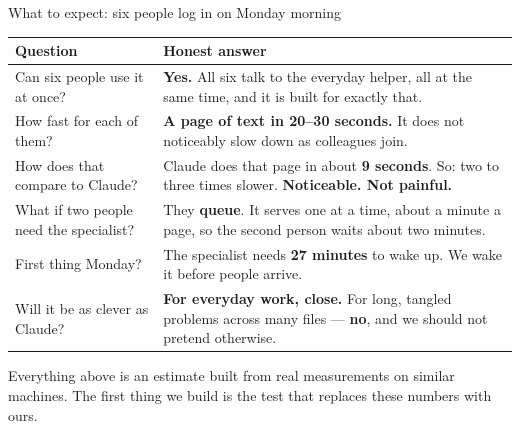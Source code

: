 \documentclass[aspectratio=169]{beamer}
\begin{document}
\begin{frame}{What to expect: six people log in on Monday morning}

\begin{center}
\scriptsize
\renewcommand{\arraystretch}{1.35}
\begin{tabular}{@{}p{}p{}@{}}
\toprule
\textbf{Question} & \textbf{Honest answer} \\
\midrule
Can six people use it at once? & \textbf{Yes.} All six talk to the everyday helper, all at the same
time, and it is built for exactly that. \\
How fast for each of them? & \textbf{A page of text in 20--30 seconds.} It does not noticeably slow
down as colleagues join. \\
How does that compare to Claude? & Claude does that page in about \textbf{9 seconds}. So: two to
three times slower. \textbf{Noticeable. Not painful.} \\
What if two people need the specialist? & They \textbf{queue}. It serves one at a time, about a
minute a page, so the second person waits about two minutes. \\
First thing Monday? & The specialist needs \textbf{27 minutes} to wake up. We wake it before people
arrive. \\
Will it be as clever as Claude? & \textbf{For everyday work, close.} For long, tangled problems
across many files --- \textbf{no}, and we should not pretend otherwise. \\
\bottomrule
\end{tabular}
\end{center}

\vspace{0.3em}
{\scriptsize Everything above is an estimate built from real measurements on similar machines. The
first thing we build is the test that replaces these numbers with ours.}

\end{frame}
\end{document}
